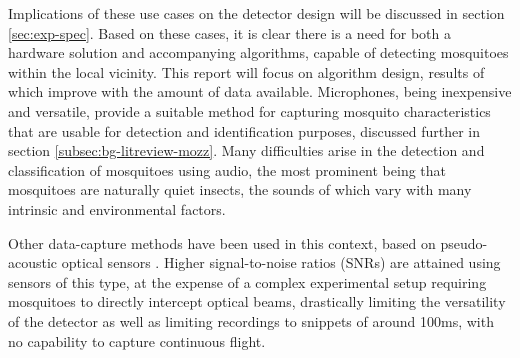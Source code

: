         Implications of these use cases on the detector design will be discussed in section \ref{sec:exp-spec}. Based on these cases, it is clear there is a need for both a hardware solution and accompanying algorithms, capable of detecting mosquitoes within the local vicinity. This report will focus on algorithm design, results of which improve with the amount of data available. Microphones, being inexpensive and versatile, provide a suitable method for capturing mosquito characteristics that are usable for detection and identification purposes, discussed further in section \ref{subsec:bg-litreview-mozz}. Many difficulties arise in the detection and classification of mosquitoes using audio, the most prominent being that mosquitoes are naturally quiet insects, the sounds of which vary with many intrinsic and environmental factors.
        
        Other data-capture methods have been used in this context, based on pseudo-acoustic optical sensors \cite{Chen2014}. Higher signal-to-noise ratios (SNRs) are attained using sensors of this type, at the expense of a complex experimental setup requiring mosquitoes to directly intercept optical beams, drastically limiting the versatility of the detector as well as limiting recordings to snippets of around 100ms, with no capability to capture continuous flight. 
        
        
        
        
  
